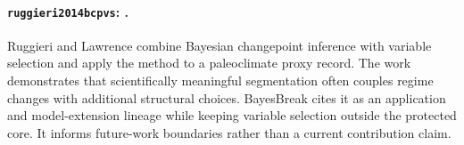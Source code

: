
\paragraph{\texttt{ruggieri2014bcpvs}: \citet{ruggieri2014bcpvs}.}
Ruggieri and Lawrence combine Bayesian changepoint inference with variable selection and apply the method to a paleoclimate proxy record. The work demonstrates that scientifically meaningful segmentation often couples regime changes with additional structural choices. BayesBreak cites it as an application and model-extension lineage while keeping variable selection outside the protected core. It informs future-work boundaries rather than a current contribution claim.
